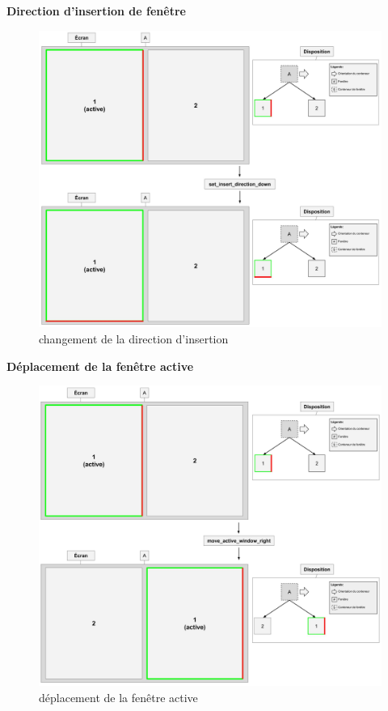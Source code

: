 \documentclass[titlepage]{article}
\begin{document}
\noindent\begin{minipage}{\linewidth}
\textbf{Direction d'insertion de fenêtre}
\begin{figure}[H]
	\centering
	\includegraphics[width=\textwidth]{set_insert_direction_down.jpg}
	\caption{changement de la direction d'insertion}
\end{figure}
\end{minipage}

\noindent\begin{minipage}{\linewidth}
\textbf{Déplacement de la fenêtre active}
\begin{figure}[H]
	\centering
	\includegraphics[width=\textwidth]{move_active_window_right.jpg}
	\caption{déplacement de la fenêtre active}
\end{figure}
\end{minipage}
\end{document}
